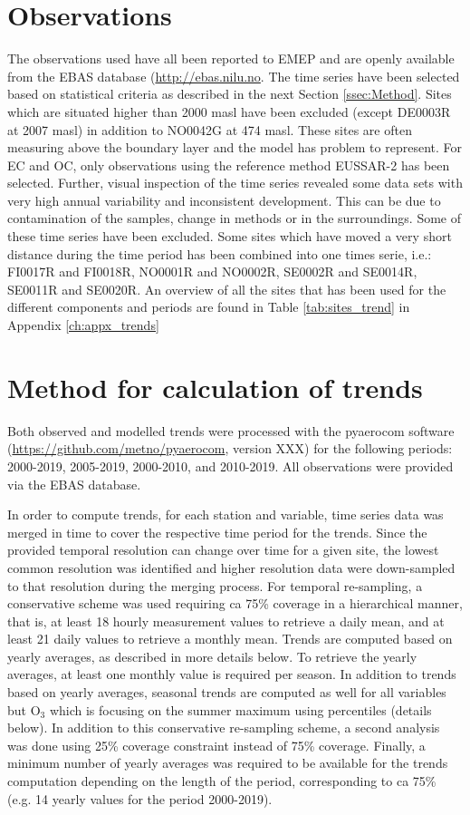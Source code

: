 \section{\label{OBSTrends}{Observations}}
The observations used have all been reported to EMEP and are openly available from the EBAS database (\url{http://ebas.nilu.no}. The time series have been selected based on statistical criteria as described in the next Section  \ref{ssec:Method}. Sites which are situated higher than 2000 masl have been excluded (except DE0003R at 2007 masl) in addition to NO0042G at 474 masl. These sites are often measuring above the boundary layer and the model has problem to represent. For EC and OC, only observations using the reference method EUSSAR-2 \citep{Cavalli:EUSAAR} has been selected. Further, visual inspection of the time series revealed some data sets with very high annual variability and inconsistent development. This can be due to contamination of the samples, change in methods or in the surroundings. Some of these time series have been excluded. Some sites which have moved a very short distance during the time period has been combined into one times serie, i.e.: FI0017R and FI0018R, NO0001R and NO0002R, SE0002R and SE0014R, SE0011R and SE0020R. An overview of all the sites that has been used for the different components and periods are found in Table \ref{tab:sites_trend} in Appendix \ref{ch:appx_trends}

\section{\label{Method}{Method for calculation of trends}}
Both observed and modelled trends were processed with the pyaerocom software (\url{https://github.com/metno/pyaerocom}, version XXX) for the following periods: 2000-2019, 2005-2019, 2000-2010, and 2010-2019. All observations were provided via the EBAS database. 

In order to compute trends, for each station and variable, time series data was merged in time to cover the respective time period for the trends.
Since the provided temporal resolution can change over time for a given site, the lowest common resolution was identified and higher resolution data were down-sampled to that resolution during the merging process. For temporal re-sampling, a conservative scheme was used requiring ca 75\% coverage in a hierarchical manner, that is, at least 18 hourly measurement values to retrieve a daily mean, and at least 21 daily values to retrieve a monthly mean. Trends are computed based on yearly averages, as described in more details below. To retrieve the yearly averages, at least one monthly value is required per season. In addition to trends based on yearly averages, seasonal trends are computed as well for all variables but O$_{3}$ which is focusing on the summer maximum using percentiles (details below). In addition to this conservative re-sampling scheme, a second analysis was done using 25\% coverage constraint instead of 75\% coverage. Finally, a minimum number of yearly averages was required to be available for the trends computation depending on the length of the period, corresponding to ca 75\% (e.g. 14 yearly values for the period 2000-2019).

